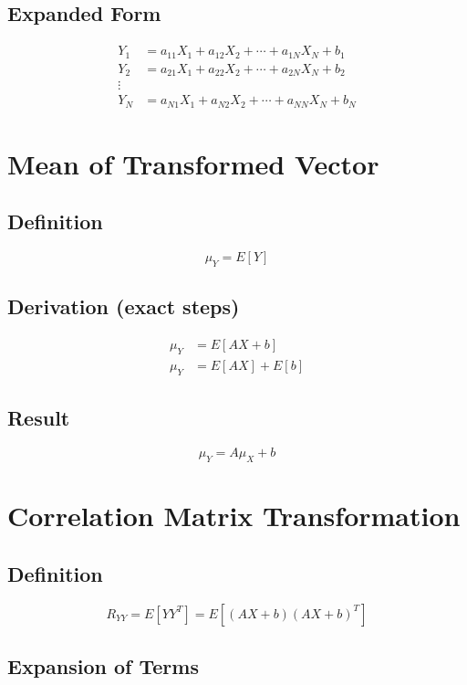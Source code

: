\documentclass[12pt]{article}
\begin{document}
\subsection{Expanded Form}

\begin{align*}
Y_1 &= a_{11}X_1 + a_{12}X_2 + \cdots + a_{1N}X_N + b_1 \\
Y_2 &= a_{21}X_1 + a_{22}X_2 + \cdots + a_{2N}X_N + b_2 \\
\vdots \\
Y_N &= a_{N1}X_1 + a_{N2}X_2 + \cdots + a_{NN}X_N + b_N
\end{align*}

\section{Mean of Transformed Vector}

\subsection{Definition}

\[
\mu_Y = E[Y]
\]

\subsection{Derivation (exact steps)}

\begin{align*}
\mu_Y &= E[AX + b] \\
\mu_Y &= E[AX] + E[b]
\end{align*}

\subsection{Result}

\[
\mu_Y = A\mu_X + b
\]

\section{Correlation Matrix Transformation}

\subsection{Definition}

\[
R_{YY} = E[YY^T] = E[(AX + b)(AX + b)^T]
\]

\subsection{Expansion of Terms}
\end{document}
